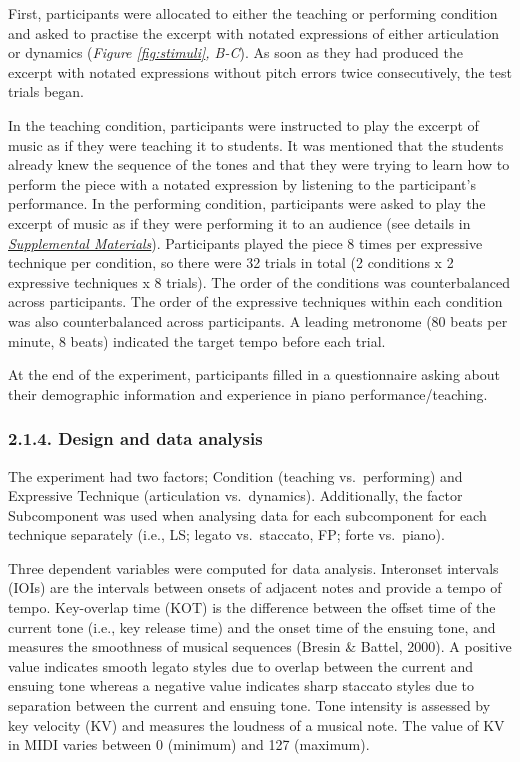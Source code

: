 \documentclass[
  english,
  man,floatsintext]{apa6}
\begin{document}
First, participants were allocated to either the teaching or performing condition and asked to practise the excerpt with notated expressions of either articulation or dynamics (\emph{Figure \ref{fig:stimuli}, B-C}). As soon as they had produced the excerpt with notated expressions without pitch errors twice consecutively, the test trials began.

In the teaching condition, participants were instructed to play the excerpt of music as if they were teaching it to students. It was mentioned that the students already knew the sequence of the tones and that they were trying to learn how to perform the piece with a notated expression by listening to the participant's performance. In the performing condition, participants were asked to play the excerpt of music as if they were performing it to an audience (see details in \emph{\protect\hyperlink{supplemental}{Supplemental Materials}}). Participants played the piece 8 times per expressive technique per condition, so there were 32 trials in total (2 conditions x 2 expressive techniques x 8 trials). The order of the conditions was counterbalanced across participants. The order of the expressive techniques within each condition was also counterbalanced across participants. A leading metronome (80 beats per minute, 8 beats) indicated the target tempo before each trial.

At the end of the experiment, participants filled in a questionnaire asking about their demographic information and experience in piano performance/teaching.

\hypertarget{design-and-data-analysis}{%
\subsubsection{2.1.4. Design and data analysis}\label{design-and-data-analysis}}

The experiment had two factors; Condition (teaching vs.~performing) and Expressive Technique (articulation vs.~dynamics). Additionally, the factor Subcomponent was used when analysing data for each subcomponent for each technique separately (i.e., LS; legato vs.~staccato, FP; forte vs.~piano).

Three dependent variables were computed for data analysis. Interonset intervals (IOIs) are the intervals between onsets of adjacent notes and provide a tempo of tempo. Key-overlap time (KOT) is the difference between the offset time of the current tone (i.e., key release time) and the onset time of the ensuing tone, and measures the smoothness of musical sequences (Bresin \& Battel, 2000). A positive value indicates smooth legato styles due to overlap between the current and ensuing tone whereas a negative value indicates sharp staccato styles due to separation between the current and ensuing tone. Tone intensity is assessed by key velocity (KV) and measures the loudness of a musical note. The value of KV in MIDI varies between 0 (minimum) and 127 (maximum).
\end{document}
